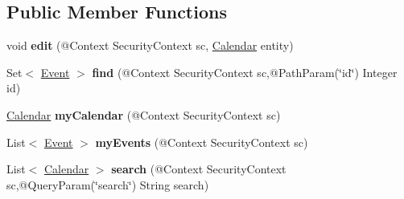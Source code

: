 \subsection*{Public Member Functions}
\begin{DoxyCompactItemize}
\item 
\hypertarget{classit_1_1polimi_1_1se_1_1calcare_1_1service_1_1CalendarFacadeREST_a04bdd0182e21e1b351b927dfa35c2e30}{}void {\bfseries edit} (@Context Security\+Context sc, \hyperlink{classit_1_1polimi_1_1se_1_1calcare_1_1entities_1_1Calendar}{Calendar} entity)\label{classit_1_1polimi_1_1se_1_1calcare_1_1service_1_1CalendarFacadeREST_a04bdd0182e21e1b351b927dfa35c2e30}

\item 
\hypertarget{classit_1_1polimi_1_1se_1_1calcare_1_1service_1_1CalendarFacadeREST_abfd3b712872cd9402dd11f45c90f46d1}{}Set$<$ \hyperlink{classit_1_1polimi_1_1se_1_1calcare_1_1entities_1_1Event}{Event} $>$ {\bfseries find} (@Context Security\+Context sc,@Path\+Param(\char`\"{}id\char`\"{}) Integer id)\label{classit_1_1polimi_1_1se_1_1calcare_1_1service_1_1CalendarFacadeREST_abfd3b712872cd9402dd11f45c90f46d1}

\item 
\hypertarget{classit_1_1polimi_1_1se_1_1calcare_1_1service_1_1CalendarFacadeREST_a68d20ca828aba8fc2e6bec66366b7589}{}\hyperlink{classit_1_1polimi_1_1se_1_1calcare_1_1entities_1_1Calendar}{Calendar} {\bfseries my\+Calendar} (@Context Security\+Context sc)\label{classit_1_1polimi_1_1se_1_1calcare_1_1service_1_1CalendarFacadeREST_a68d20ca828aba8fc2e6bec66366b7589}

\item 
\hypertarget{classit_1_1polimi_1_1se_1_1calcare_1_1service_1_1CalendarFacadeREST_ac2e6ad5d570425d8ced1885b963f01df}{}List$<$ \hyperlink{classit_1_1polimi_1_1se_1_1calcare_1_1entities_1_1Event}{Event} $>$ {\bfseries my\+Events} (@Context Security\+Context sc)\label{classit_1_1polimi_1_1se_1_1calcare_1_1service_1_1CalendarFacadeREST_ac2e6ad5d570425d8ced1885b963f01df}

\item 
\hypertarget{classit_1_1polimi_1_1se_1_1calcare_1_1service_1_1CalendarFacadeREST_a9bc25eb65ea704a3db692a5c6a96fb13}{}List$<$ \hyperlink{classit_1_1polimi_1_1se_1_1calcare_1_1entities_1_1Calendar}{Calendar} $>$ {\bfseries search} (@Context Security\+Context sc,@Query\+Param(\char`\"{}search\char`\"{}) String search)\label{classit_1_1polimi_1_1se_1_1calcare_1_1service_1_1CalendarFacadeREST_a9bc25eb65ea704a3db692a5c6a96fb13}

\end{DoxyCompactItemize}
